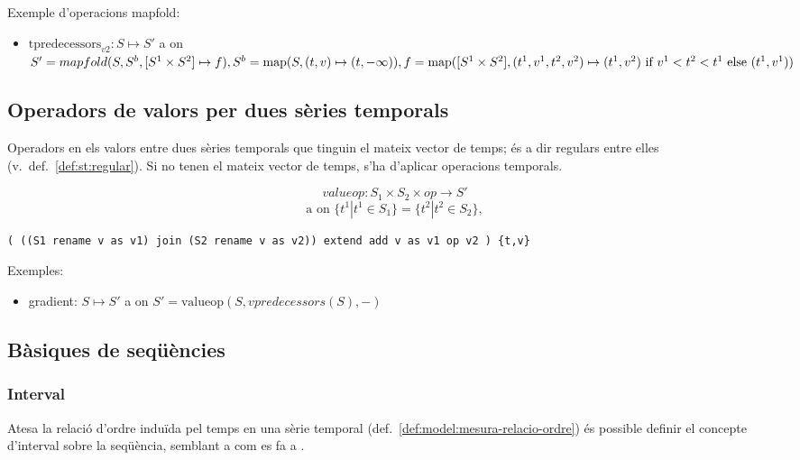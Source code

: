 Exemple d'operacions mapfold:
\begin{itemize}
\item $\text{tpredecessors}_{v2}: S \mapsto S'$ a on $S'=
  mapfold(S,S^b,[S^1\times S^2]\mapsto f), S^b =
  \operatorname*{map}(S,(t,v)\mapsto(t,-\infty)), f=\operatorname*{map}([S^1\times
  S^2],(t^1,v^1,t^2,v^2)\mapsto (t^1,v^2) \text{ if } v^1<t^2<t^1
  \text{ else } (t^1,v^1))$
\end{itemize}


\subsection{Operadors de valors per dues sèries temporals}

Operadors en els valors entre dues sèries temporals que tinguin el
mateix vector de temps; és a dir regulars entre elles
(v.\ def.~\ref{def:st:regular}). Si no tenen el mateix vector de temps, s'ha
d'aplicar operacions temporals. 

\[
valueop: S_1 \times S_2 \times op \longrightarrow S'
\]
\[
\text{a on } \{t^1|t^1\in S_1\} = \{t^2|t^2\in S_2\}, 
\]

\begin{verbatim} 
( ((S1 rename v as v1) join (S2 rename v as v2)) extend add v as v1 op v2 ) {t,v}
\end{verbatim}



Exemples:
\begin{itemize}
\item gradient: $S \mapsto S'$ a on $S'= \text{valueop}(S,vpredecessors(S),-)$
\end{itemize}




\subsection{Bàsiques de seqüències}






\subsubsection{Interval}

Atesa la relació d'ordre induïda pel temps en una sèrie temporal
(def.\ \ref{def:model:mesura-relacio-ordre}) és possible definir el
concepte d'interval sobre la seqüència, semblant a com es fa a
\cite{last:keogh,last:hetland}.

